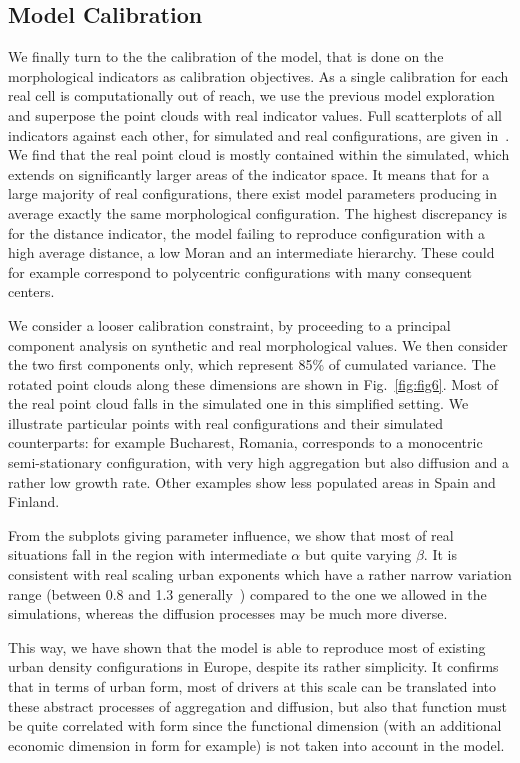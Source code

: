 \documentclass[10pt,letterpaper]{article}
\begin{document}
\subsection*{Model Calibration}


We finally turn to the the calibration of the model, that is done on the morphological indicators as calibration objectives. As a single calibration for each real cell is computationally out of reach, we use the previous model exploration and superpose the point clouds with real indicator values. Full scatterplots of all indicators against each other, for simulated and real configurations, are given in~. We find that the real point cloud is mostly contained within the simulated, which extends on significantly larger areas of the indicator space. It means that for a large majority of real configurations, there exist model parameters producing in average exactly the same morphological configuration. The highest discrepancy is for the distance indicator, the model failing to reproduce configuration with a high average distance, a low Moran and an intermediate hierarchy. These could for example correspond to polycentric configurations with many consequent centers.

We consider a looser calibration constraint, by proceeding to a principal component analysis on synthetic and real morphological values. We then consider the two first components only, which represent 85\% of cumulated variance. The rotated point clouds along these dimensions are shown in Fig.~\ref{fig:fig6}. Most of the real point cloud falls in the simulated one in this simplified setting. We illustrate particular points with real configurations and their simulated counterparts: for example Bucharest, Romania, corresponds to a monocentric semi-stationary configuration, with very high aggregation but also diffusion and a rather low growth rate. Other examples show less populated areas in Spain and Finland.

From the subplots giving parameter influence, we show that most of real situations fall in the region with intermediate $\alpha$ but quite varying $\beta$. It is consistent with real scaling urban exponents which have a rather narrow variation range (between 0.8 and 1.3 generally~\cite{pumain2006evolutionary}) compared to the one we allowed in the simulations, whereas the diffusion processes may be much more diverse. 

This way, we have shown that the model is able to reproduce most of existing urban density configurations in Europe, despite its rather simplicity. It confirms that in terms of urban form, most of drivers at this scale can be translated into these abstract processes of aggregation and diffusion, but also that function must be quite correlated with form since the functional dimension (with an additional economic dimension in form for example) is not taken into account in the model.
\end{document}
